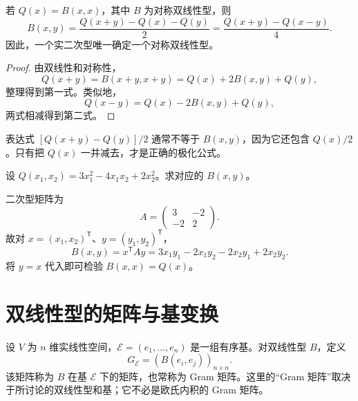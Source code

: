 \begin{theorem}[实数域上的极化公式]
若 $Q(x)=B(x,x)$，其中 $B$ 为对称双线性型，则
\[
B(x,y)=\frac{Q(x+y)-Q(x)-Q(y)}2
=\frac{Q(x+y)-Q(x-y)}4.
\]
因此，一个实二次型唯一确定一个对称双线性型。
\end{theorem}
\begin{proof}
由双线性和对称性，
\[
Q(x+y)=B(x+y,x+y)=Q(x)+2B(x,y)+Q(y),
\]
整理得到第一式。类似地，
\[
Q(x-y)=Q(x)-2B(x,y)+Q(y),
\]
两式相减得到第二式。
\end{proof}

\begin{remark}
表达式 $[Q(x+y)-Q(y)]/2$ 通常不等于 $B(x,y)$，因为它还包含 $Q(x)/2$。只有把 $Q(x)$ 一并减去，才是正确的极化公式。
\end{remark}

\begin{example}[title={由二次型恢复双线性型}]
设 $Q(x_1,x_2)=3x_1^2-4x_1x_2+2x_2^2$。求对应的 $B(x,y)$。
\begin{solution}
二次型矩阵为
\[
A=\begin{pmatrix}3&-2\\-2&2\end{pmatrix}.
\]
故对 $x=(x_1,x_2)^{\mathsf T}$、$y=(y_1,y_2)^{\mathsf T}$，
\[
B(x,y)=x^{\mathsf T}Ay=3x_1y_1-2x_1y_2-2x_2y_1+2x_2y_2.
\]
将 $y=x$ 代入即可检验 $B(x,x)=Q(x)$。
\end{solution}
\end{example}

\section{双线性型的矩阵与基变换}

设 $V$ 为 $n$ 维实线性空间，$\mathcal E=(e_1,\ldots,e_n)$ 是一组有序基。对双线性型 $B$，定义
\[
G_{\mathcal E}=(B(e_i,e_j))_{n\times n}.
\]
该矩阵称为 $B$ 在基 $\mathcal E$ 下的矩阵，也常称为 Gram 矩阵。这里的“Gram 矩阵”取决于所讨论的双线性型和基；它不必是欧氏内积的 Gram 矩阵。

